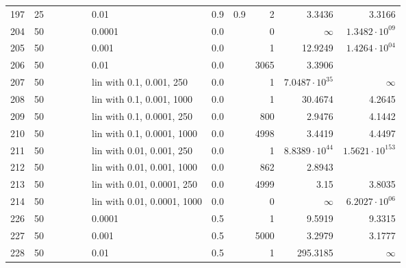 \begin{longtable}{lrrrrrlrrrrr}
 197 &      25 &   &   &   &   &                        0.01 &  0.9 &    0.9 &       2 &                 3.3436 &                 3.3166 \\
 204 &      50 &   &   &   &   &                      0.0001 &  0.0 &        &       0 &               $\infty$ &  $1.3482\cdot 10^{09}$ \\
 205 &      50 &   &   &   &   &                       0.001 &  0.0 &        &       1 &                12.9249 &  $1.4264\cdot 10^{04}$ \\
 206 &      50 &   &   &   &   &                        0.01 &  0.0 &        &    3065 &                 3.3906 &                        \\
 207 &      50 &   &   &   &   &    lin with 0.1, 0.001, 250 &  0.0 &        &       1 &  $7.0487\cdot 10^{35}$ &               $\infty$ \\
 208 &      50 &   &   &   &   &   lin with 0.1, 0.001, 1000 &  0.0 &        &       1 &                30.4674 &                 4.2645 \\
 209 &      50 &   &   &   &   &   lin with 0.1, 0.0001, 250 &  0.0 &        &     800 &                 2.9476 &                 4.1442 \\
 210 &      50 &   &   &   &   &  lin with 0.1, 0.0001, 1000 &  0.0 &        &    4998 &                 3.4419 &                 4.4497 \\
 211 &      50 &   &   &   &   &   lin with 0.01, 0.001, 250 &  0.0 &        &       1 &  $8.8389\cdot 10^{44}$ & $1.5621\cdot 10^{153}$ \\
 212 &      50 &   &   &   &   &  lin with 0.01, 0.001, 1000 &  0.0 &        &     862 &                 2.8943 &                        \\
 213 &      50 &   &   &   &   &  lin with 0.01, 0.0001, 250 &  0.0 &        &    4999 &                   3.15 &                 3.8035 \\
 214 &      50 &   &   &   &   & lin with 0.01, 0.0001, 1000 &  0.0 &        &       0 &               $\infty$ &  $6.2027\cdot 10^{06}$ \\
 226 &      50 &   &   &   &   &                      0.0001 &  0.5 &        &       1 &                 9.5919 &                 9.3315 \\
 227 &      50 &   &   &   &   &                       0.001 &  0.5 &        &    5000 &                 3.2979 &                 3.1777 \\
 228 &      50 &   &   &   &   &                        0.01 &  0.5 &        &       1 &               295.3185 &               $\infty$ \\

\end{longtable}
